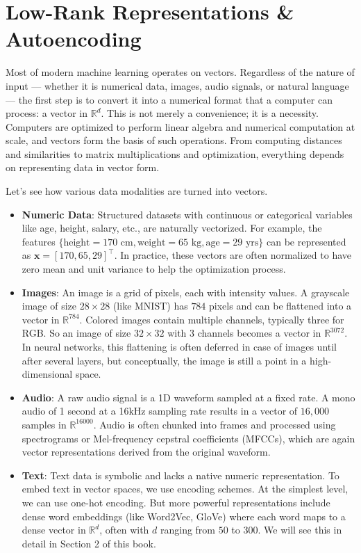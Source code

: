 \chapter{Low-Rank Representations \& Autoencoding}

Most of modern machine learning operates on vectors. Regardless of the nature of input — whether it is numerical data, images, audio signals, or natural language — the first step is to convert it into a numerical format that a computer can process: a vector in $\mathbb{R}^d$. This is not merely a convenience; it is a necessity. Computers are optimized to perform linear algebra and numerical computation at scale, and vectors form the basis of such operations. From computing distances and similarities to matrix multiplications and optimization, everything depends on representing data in vector form.

Let’s see how various data modalities are turned into vectors.
\begin{itemize}
    \item \textbf{Numeric Data}: Structured datasets with continuous or categorical variables like age, height, salary, etc., are naturally vectorized. For example, the features $\{\text{height}=170\text{ cm}, \text{weight}=65\text{ kg}, \text{age}=29\text{ yrs}\}$ can be represented as $\mathbf{x} = [170, 65, 29]^\top$. In practice, these vectors are often normalized to have zero mean and unit variance to help the optimization process.

    \item \textbf{Images}: An image is a grid of pixels, each with intensity values. A grayscale image of size $28 \times 28$ (like MNIST) has $784$ pixels and can be flattened into a vector in $\mathbb{R}^{784}$. Colored images contain multiple channels, typically three for RGB. So an image of size $32 \times 32$ with 3 channels becomes a vector in $\mathbb{R}^{3072}$. In neural networks, this flattening is often deferred in case of images until after several layers, but conceptually, the image is still a point in a high-dimensional space.

    \item \textbf{Audio}: A raw audio signal is a 1D waveform sampled at a fixed rate. A mono audio of 1 second at a 16kHz sampling rate results in a vector of $16,000$ samples in $\mathbb{R}^{16000}$. Audio is often chunked into frames and processed using spectrograms or Mel-frequency cepstral coefficients (MFCCs), which are again vector representations derived from the original waveform.

    \item \textbf{Text}: Text data is symbolic and lacks a native numeric representation. To embed text in vector spaces, we use encoding schemes. At the simplest level, we can use one-hot encoding. But more powerful representations include dense word embeddings (like Word2Vec, GloVe) where each word maps to a dense vector in $\mathbb{R}^d$, often with $d$ ranging from $50$ to $300$. We will see this in detail in Section 2 of this book. 
\end{itemize}

